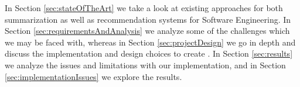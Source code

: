 In Section \ref{sec:stateOfTheArt} we take a look at existing approaches for both summarization as well as recommendation systems for Software Engineering. In Section \ref{sec:requirementsAndAnalysis} we analyze some of the challenges which we may be faced with, whereas in Section \ref{sec:projectDesign} we go in depth and discuss the implementation and design choices to create \projectName. In Section \ref{sec:results} we analyze the issues and limitations with our implementation, and in Section \ref{sec:implementationIssues} we explore the results.

